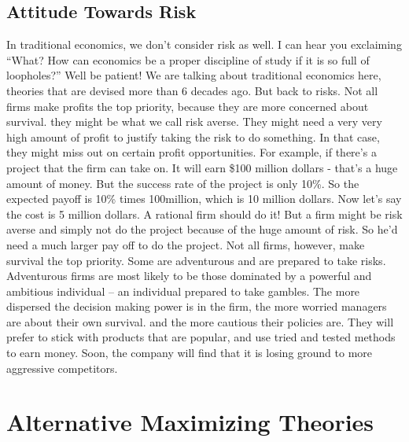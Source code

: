 \documentclass[DIV=calc,11pt,parskip,numbers=noenddot]{scrartcl} %
\begin{document}
\subsection{Attitude Towards Risk}
 In traditional economics, we don’t consider risk as well. I can hear you exclaiming “What? How can economics be a proper discipline of study if it is so full of loopholes?” Well be patient! We are talking about traditional economics here, theories that are devised more than 6 decades ago. But back to risks. Not all firms make profits the top priority, because they are more concerned about survival. they might be what we call risk averse. They might need a very very high amount of profit to justify taking the risk to do something. In that case, they might miss out on certain profit opportunities. For example, if there’s a project that the firm can take on. It will earn \$100 million dollars - that’s a huge amount of money. But the success rate of the project is only 10\%. So the expected payoff is 10\% times 100million, which is 10 million dollars. Now let’s say the cost is 5 million dollars. A rational firm should do it! But a firm might be risk averse and simply not do the project because of the huge amount of risk. So he’d need a much larger pay off to do the project. Not all firms, however, make survival the top priority. Some are adventurous and are prepared to take risks. Adventurous firms are most likely to be those dominated by a powerful and ambitious individual – an individual prepared to take gambles. The more dispersed the decision making power is in the firm, the more worried managers are about their own survival. and the more cautious their policies are. They will prefer to stick with products that are popular, and use tried and tested methods to earn money. Soon, the company will find that it is losing ground to more aggressive competitors.
\newpage
\section{Alternative Maximizing Theories}
\end{document}
